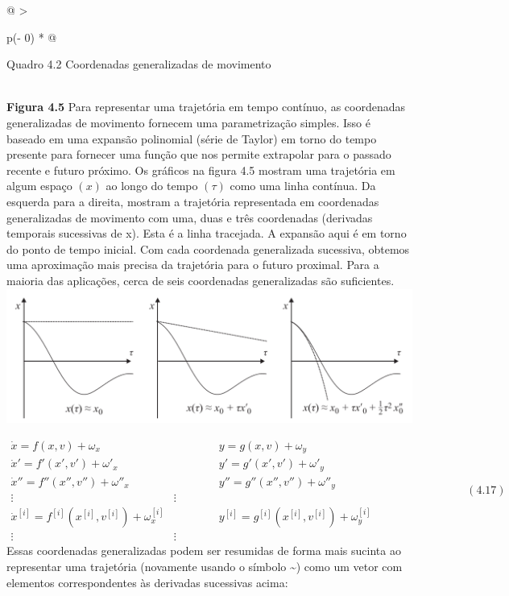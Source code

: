 \documentclass[
  12pt,
]{book}
\begin{document}
\begin{longtable}[]{@{}
  >{\raggedright\arraybackslash}p{(\columnwidth - 0\tabcolsep) * }@{}}
\toprule
\begin{minipage}[b]{\linewidth}\raggedright
Quadro 4.2 Coordenadas generalizadas de movimento
\end{minipage} \\
\midrule
\endhead
\textbf{Figura 4.5} Para representar uma trajetória em tempo contínuo, as coordenadas generalizadas de movimento fornecem uma parametrização simples. Isso é baseado em uma expansão polinomial (série de Taylor) em torno do tempo presente para fornecer uma função que nos permite extrapolar para o passado recente e futuro próximo. Os gráficos na figura 4.5 mostram uma trajetória em algum espaço \((x)\) ao longo do tempo \((\tau)\) como uma linha contínua. Da esquerda para a direita, mostram a trajetória representada em coordenadas generalizadas de movimento com uma, duas e três coordenadas (derivadas temporais sucessivas de x). Esta é a linha tracejada. A expansão aqui é em torno do ponto de tempo inicial. Com cada coordenada generalizada sucessiva, obtemos uma aproximação mais precisa da trajetória para o futuro proximal. Para a maioria das aplicações, cerca de seis coordenadas generalizadas são suficientes.\includegraphics{images/Figura_4_5.png} \\
\bottomrule
\end{longtable}

\[ \begin{matrix}  
\dot x = f(x,v) + \omega_x & \qquad \qquad y = g(x,v) + \omega_y \\
\dot x' = f'(x',v') + \omega'_x & \qquad \qquad y' = g'(x',v') + \omega'_y \\
\dot x'' = f''(x'',v'') + \omega''_x & \qquad \qquad y'' = g''(x'',v'') + \omega''_y \\
\vdots & \vdots \\
\dot x^{[i]} = f^{[i]}(x^{[i]},v^{[i]}) + \omega^{[i]}_x & \qquad \qquad y^{[i]} = g^{[i]}(x^{[i]},v^{[i]}) + \omega^{[i]}_y \\
\vdots & \vdots
 \end{matrix}  \qquad\qquad\qquad\qquad (4.17) \] Essas coordenadas
generalizadas podem ser resumidas de forma mais sucinta ao representar
uma trajetória (novamente usando o símbolo \textasciitilde) como um vetor com
elementos correspondentes às derivadas sucessivas acima:
\end{document}
